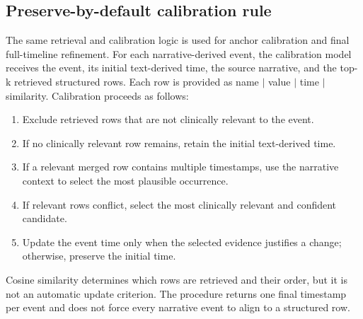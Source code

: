 \FloatBarrier
\subsection{Preserve-by-default calibration rule}\label{ch08:supp:calibration-rule}
\noindent The same retrieval and calibration logic is used for anchor calibration and final full-timeline refinement. For each narrative-derived event, the calibration model receives the event, its initial text-derived time, the source narrative, and the top-k retrieved structured rows. Each row is provided as name $\mid$ value $\mid$ time $\mid$ similarity. Calibration proceeds as follows:
\begin{enumerate}
    \item Exclude retrieved rows that are not clinically relevant to the event.
    \item If no clinically relevant row remains, retain the initial text-derived time.
    \item If a relevant merged row contains multiple timestamps, use the narrative context to select the most plausible occurrence.
    \item If relevant rows conflict, select the most clinically relevant and confident candidate.
    \item Update the event time only when the selected evidence justifies a change; otherwise, preserve the initial time.
\end{enumerate}
Cosine similarity determines which rows are retrieved and their order, but it is not an automatic update criterion. The procedure returns one final timestamp per event and does not force every narrative event to align to a structured row.

